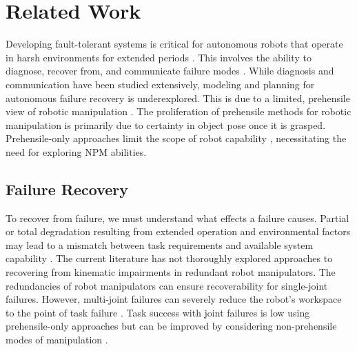 \section{Related Work}\label{sec:related}
Developing fault-tolerant systems is critical for autonomous robots that operate in harsh environments for extended periods \cite{muirhead2012coalescing, papadopoulos2021robotic}. This involves the ability to diagnose, recover from, and communicate failure modes \cite{visinsky1991fault, lewis1997fault, honig2018understanding}. While diagnosis and communication have been studied extensively, modeling and planning for autonomous failure recovery is underexplored. This is due to a limited, prehensile view of robotic manipulation \cite{Billard2019, SUOMALAINEN2022104224}. 
The proliferation of prehensile methods for robotic manipulation is primarily due to certainty in object pose once it is grasped. Prehensile-only approaches limit the scope of robot capability \cite{ruggiero2018nonprehensile}, necessitating the need for exploring NPM abilities.

\subsection{Failure Recovery}
To recover from failure, we must understand what effects a failure causes. Partial or total degradation resulting from extended operation and environmental factors may lead to a mismatch between task requirements and available system capability \cite{austin2020robotic, muirhead2012coalescing, shafaei2022dust}. 
The current literature has not thoroughly explored approaches to recovering from kinematic impairments in redundant robot manipulators.  The redundancies of robot manipulators can ensure recoverability for single-joint failures. However, multi-joint failures can severely reduce the robot's workspace to the point of task failure \cite{ porges2021planning}. Task success with joint failures is low using prehensile-only approaches but can be improved by considering non-prehensile modes of manipulation \cite{ruggiero2018nonprehensile}.





